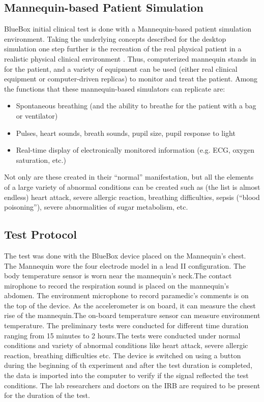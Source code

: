 \subsection{Mannequin-based Patient Simulation}
BlueBox initial clinical test is done with a Mannequin-based patient simulation environment.
Taking the underlying concepts described for the desktop simulation one step further is the recreation of the real physical patient in a realistic physical clinical environment \cite{man}. Thus, computerized mannequin stands in for the patient, and a variety of equipment can be used (either real clinical equipment or computer-driven replicas) to monitor and treat the patient.
Among the functions that these mannequin-based simulators can replicate are:
\begin{itemize}
	\item Spontaneous breathing (and the ability to breathe for the patient with a bag or ventilator)
	\item Pulses, heart sounds, breath sounds, pupil size, pupil response to light
	
	\item Real-time display of electronically monitored information (e.g. ECG, oxygen saturation, etc.)	
\end{itemize}

Not only are these created in their “normal” manifestation, but all the elements of a large variety of abnormal conditions can be created such as (the list is almost endless) heart attack, severe allergic reaction, breathing difficulties, sepsis (“blood poisoning”), severe abnormalities of sugar metabolism, etc.

\subsection{Test Protocol}
The test was done with the BlueBox device placed on the Mannequin's chest. The Mannequin wore the four electrode model in a lead II configuration. The body temperature sensor is worn near the mannequin's neck.The contact mirophone to record the respiration sound is placed on the mannequin's abdomen. The environment microphone to record paramedic's comments is on the top of the device. As the accelerometer is on board, it can measure the chest rise of the mannequin.The on-board temperature sensor can measure environment temperature.  The preliminary tests were conducted for different time duration ranging from 15 minutes to 2 hours.The tests were conducted under normal conditions and variety of abnormal conditions like heart attack, severe allergic reaction, breathing difficulties etc. The device is switched on using a button during the beginning of th experiment and after the test duration is completed, the data is imported into the computer to verify if the signal reflected the test conditions. The lab researchers and doctors on the IRB are required to be present for the duration of the test. 

